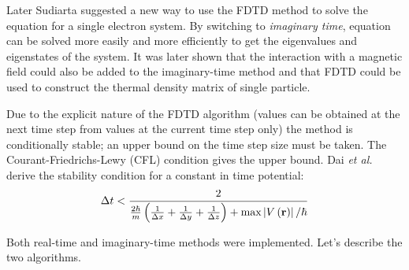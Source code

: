 Later Sudiarta suggested\cite{Sudiarta2007} a new way to use the FDTD method to
solve the \schrodinger equation for a single electron system. By switching to
\textit{imaginary time}, \schrodinger equation can be solved more easily and
more efficiently to get the eigenvalues and eigenstates of the system. It was
later shown that the interaction with a magnetic field could also be added to
the imaginary-time method\cite{Sudiarta2008} and that FDTD could be used to
construct the thermal density matrix of single particle\cite{Sudiarta2009}.

Due to the explicit nature of the FDTD algorithm (values can be obtained at the
next time step from values at the current time step only) the method is
conditionally stable; an upper bound on the time step size must be taken. The
Courant-Friedrichs-Lewy (CFL) condition gives the upper bound. Dai \textit{et
al.} derive\cite{Dai2005} the stability condition for a constant in time
potential:
\begin{align}
\Delta t < \frac{2}{
    \frac{2 \hbar}{m} \left( 
         \frac{1}{\Delta x}
        +\frac{1}{\Delta y}
        +\frac{1}{\Delta z}
         \right)
        + \textrm{max}\left| V\left( \textbf{r} \right) \right| / \hbar
    }
\end{align}


Both real-time and imaginary-time methods were implemented. Let's describe the
two algorithms.

